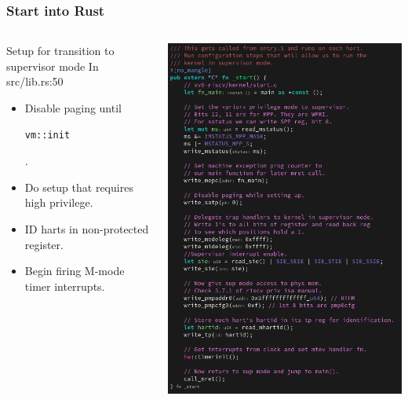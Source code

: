 \documentclass{beamer}
\begin{document}
\begin{frame}[fragile]
  \frametitle{Start into Rust}
  \begin{columns}
    \begin{column}{0.5\textwidth}
      Setup for transition to supervisor mode
      In src/lib.rs:50
      \begin{itemize}
      \item Disable paging until \begin{verbatim}vm::init\end{verbatim}.\\
      \item Do setup that requires high privilege.\\
      \item ID harts in non-protected register.\\
      \item Begin firing M-mode timer interrupts.
      \end{itemize}
    \end{column}
    \begin{column}{0.5\textwidth}
      \includegraphics[width=\textwidth]{start.png}
    \end{column}
  \end{columns}
\end{frame}
\end{document}
